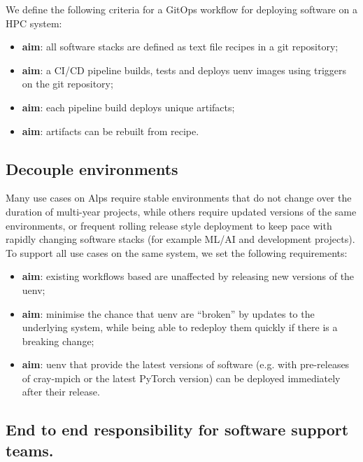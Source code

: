 We define the following criteria for a GitOps workflow for deploying software on a HPC system:
\begin{itemize}
    \item \textbf{aim}: all software stacks are defined as text file recipes in a git repository;
    \item \textbf{aim}: a CI/CD pipeline builds, tests and deploys uenv images using triggers on the git repository;
    \item \textbf{aim}: each pipeline build deploys unique artifacts;
    \item \textbf{aim}: artifacts can be rebuilt from recipe.
\end{itemize}

\subsection{Decouple environments}

Many use cases on Alps require stable environments that do not change over the duration of multi-year projects,
while others require updated versions of the same environments, or frequent rolling release style deployment to keep pace with rapidly changing software stacks (for example ML/AI and development projects).
To support all use cases on the same system, we set the following requirements:
\begin{itemize}
    \item \textbf{aim}: existing workflows based are unaffected by releasing new versions of the uenv;
    \item \textbf{aim}: minimise the chance that uenv are ``broken'' by updates to the underlying system, while being able to redeploy them quickly if there is a breaking change;
    \item \textbf{aim}: uenv that provide the latest versions of software (e.g. with pre-releases of cray-mpich or the latest PyTorch version) can be deployed immediately after their release.
\end{itemize}

\subsection{End to end responsibility for software support teams.}
\label{sec:objective-e2e}

